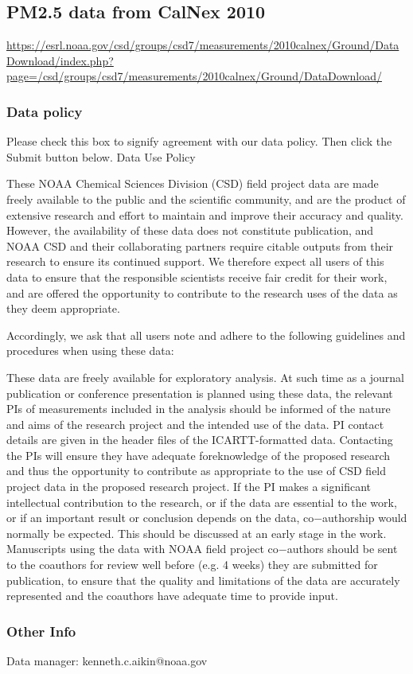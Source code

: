 \subsection{PM2.5 data from CalNex 2010}
\url{https://esrl.noaa.gov/csd/groups/csd7/measurements/2010calnex/Ground/DataDownload/index.php?page=/csd/groups/csd7/measurements/2010calnex/Ground/DataDownload/}

\subsubsection{Data policy}

  Please check this box to signify agreement with our data policy. Then click the Submit button below.
Data Use Policy

These NOAA Chemical Sciences Division (CSD) field project data are made freely available to the public and the scientific community, and are the product of extensive research and effort to maintain and improve their accuracy and quality. However, the availability of these data does not constitute publication, and NOAA CSD and their collaborating partners require citable outputs from their research to ensure its continued support. We therefore expect all users of this data to ensure that the responsible scientists receive fair credit for their work, and are offered the opportunity to contribute to the research uses of the data as they deem appropriate.

Accordingly, we ask that all users note and adhere to the following guidelines and procedures when using these data:

    These data are freely available for exploratory analysis. At such time as a journal publication or conference presentation is planned using these data, the relevant PIs of measurements included in the analysis should be informed of the nature and aims of the research project and the intended use of the data. PI contact details are given in the header files of the ICARTT-formatted data.
    Contacting the PIs will ensure they have adequate foreknowledge of the proposed research and thus the opportunity to contribute as appropriate to the use of CSD field project data in the proposed research project.
    If the PI makes a significant intellectual contribution to the research, or if the data are essential to the work, or if an important result or conclusion depends on the data, co−authorship would normally be expected. This should be discussed at an early stage in the work.
    Manuscripts using the data with NOAA field project co−authors should be sent to the coauthors for review well before (e.g. 4 weeks) they are submitted for publication, to ensure that the quality and limitations of the data are accurately represented and the coauthors have adequate time to provide input.
\subsubsection{Other Info}    
Data manager: kenneth.c.aikin@noaa.gov 